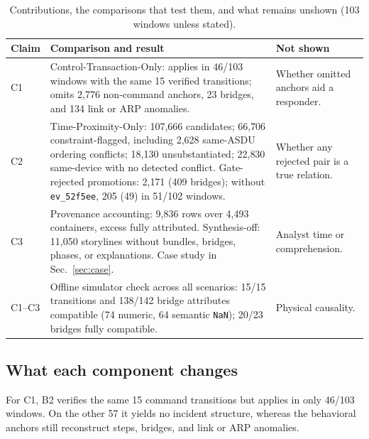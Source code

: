 \documentclass[conference]{IEEEtran}
\begin{document}
\begin{table}[t]
\caption{Contributions, the comparisons that test them, and what remains unshown (103 windows unless stated).}
\label{tab:claims}
\centering
\scriptsize
\setlength{\tabcolsep}{2.2pt}
\begin{tabular}{@{}>{\raggedright\arraybackslash}p{}>{\raggedright\arraybackslash}p{}>{\raggedright\arraybackslash}p{}@{}}
\toprule
Claim & Comparison and result & Not shown \\
\midrule
C1 & Control-Transaction-Only: applies in 46/103 windows with the same 15 verified transitions; omits 2{,}776 non-command anchors, 23 bridges, and 134 link or ARP anomalies. & Whether omitted anchors aid a responder. \\
C2 & Time-Proximity-Only: 107{,}666 candidates; 66{,}706 constraint-flagged, including 2{,}628 same-ASDU ordering conflicts; 18{,}130 unsubstantiated; 22{,}830 same-device with no detected conflict. Gate-rejected promotions: 2{,}171 (409 bridges); without \texttt{ev\_52f5ee}, 205 (49) in 51/102 windows. & Whether any rejected pair is a true relation. \\
C3 & Provenance accounting: 9{,}836 rows over 4{,}493 containers, excess fully attributed. Synthesis-off: 11{,}050 storylines without bundles, bridges, phases, or explanations. Case study in Sec.~\ref{sec:case}. & Analyst time or comprehension. \\
C1--C3 & Offline simulator check across all scenarios: 15/15 transitions and 138/142 bridge attributes compatible (74 numeric, 64 semantic \texttt{NaN}); 20/23 bridges fully compatible. & Physical causality. \\
\bottomrule
\end{tabular}
\end{table}

\subsection{What each component changes}
For C1, B2 verifies the same 15 command transitions but applies in only 46/103 windows.
On the other 57 it yields no incident structure, whereas the behavioral anchors still reconstruct steps, bridges, and link or ARP anomalies.
\end{document}
